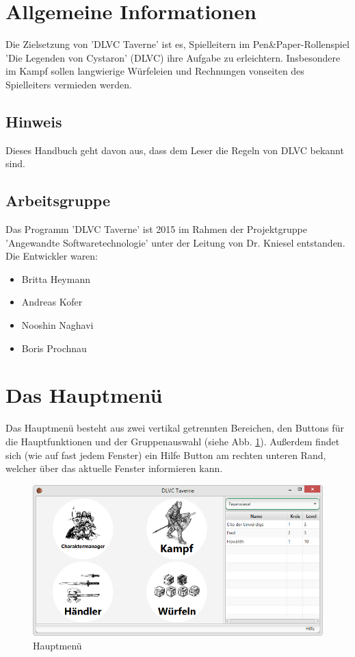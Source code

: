 \documentclass[11pt, a4paper, german]{article}
\begin{document}

\clearpage

\tableofcontents
\pagebreak

\section{Allgemeine Informationen}
Die Zielsetzung von 'DLVC Taverne' ist es, Spielleitern im Pen\&Paper-Rollenspiel 'Die Legenden von Cystaron' (DLVC) ihre Aufgabe zu erleichtern. Insbesondere im Kampf sollen langwierige Würfeleien und Rechnungen vonseiten des Spielleiters vermieden werden.
\subsection{Hinweis}
Dieses Handbuch geht davon aus, dass dem Leser die Regeln von DLVC bekannt sind. 
\subsection{Arbeitsgruppe}
Das Programm 'DLVC Taverne' ist 2015 im Rahmen der Projektgruppe 'Angewandte Softwaretechnologie' unter der Leitung von Dr. Kniesel entstanden. Die Entwickler waren:
\begin{itemize}
	\item[] Britta Heymann
	\item[] Andreas Kofer
	\item[] Nooshin Naghavi
	\item[] Boris Prochnau
\end{itemize}

\newpage
\section{Das Hauptmenü}
Das Hauptmenü besteht aus zwei vertikal getrennten Bereichen, den Buttons für die Hauptfunktionen und der Gruppenauswahl (siehe Abb. \ref{fig:Hauptmenue1}). Außerdem findet sich (wie auf fast jedem Fenster) ein Hilfe Button am rechten unteren Rand, welcher über das aktuelle Fenster informieren kann.
\begin{figure}
\centering
\includegraphics[width=1\linewidth]{Bilder/Hauptmenue1}
\caption{Hauptmenü}
\label{fig:Hauptmenue1}
\end{figure}
\end{document}
